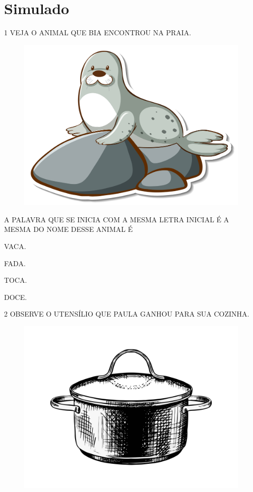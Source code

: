 \setcounter{chapter}{0}
\chapter[Simulado 1]{Simulado}

\num{1} VEJA O ANIMAL QUE BIA ENCONTROU NA PRAIA.

\begin{figure}[H]
\centering
\includegraphics[width=.6\textwidth]{./media/image210.jpg}
\end{figure}

A PALAVRA QUE SE INICIA COM A MESMA LETRA INICIAL É A MESMA DO NOME DESSE ANIMAL É

\begin{escolha}

\item VACA.

\item FADA.

\item TOCA.

\item DOCE.

\end{escolha}

\num{2} OBSERVE O UTENSÍLIO QUE PAULA GANHOU PARA SUA COZINHA.

\begin{figure}[H]
\centering
\includegraphics[width=.6\textwidth]{./media/image211.jpg}
\end{figure}

